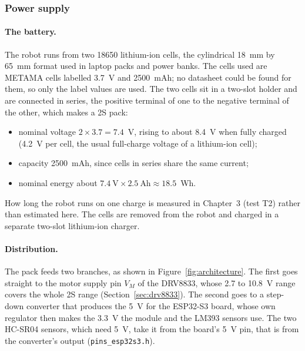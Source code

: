 \subsubsection{Power supply}
\label{sec:robot-power}
\paragraph{The battery.} The robot runs from two 18650 lithium-ion cells, the
cylindrical 18~mm by 65~mm format used in laptop packs and power banks. The cells used
are METAMA cells labelled 3.7~V and 2500~mAh; no datasheet could be found for them, so
only the label values are used. The two cells sit in a two-slot holder and are connected in series, the
positive terminal of one to the negative terminal of the other, which makes a 2S pack:
\begin{itemize}
  \item nominal voltage \(2 \times 3.7 = 7.4\)~V, rising to about 8.4~V when fully
        charged (4.2~V per cell, the usual full-charge voltage of a lithium-ion cell);
  \item capacity 2500~mAh, since cells in series share the same current;
  \item nominal energy about \(7.4~\text{V} \times 2.5~\text{Ah} \approx 18.5\)~Wh.
\end{itemize}
How long the robot runs on one charge is measured in Chapter~3 (test T2) rather than
estimated here. The cells are removed from the robot and charged in a separate two-slot
lithium-ion charger.

\paragraph{Distribution.} The pack feeds two branches, as shown in
Figure~\ref{fig:architecture}. The first goes straight to the motor supply pin
\(V_M\) of the DRV8833, whose 2.7 to 10.8~V range covers the whole 2S range
(Section~\ref{sec:drv8833}). The second goes to a step-down converter that produces the
5~V for the ESP32-S3 board, whose own regulator then makes the 3.3~V the module and the
LM393 sensors use. The two HC-SR04 sensors, which need 5~V, take it from the board's 5~V pin, that
is from the converter's output (\texttt{pins\_esp32s3.h}).

